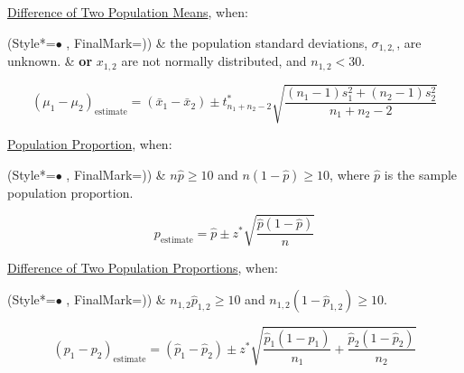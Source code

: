\underline{Difference of Two Population Means}, when:
\begin{easylist}[itemize]
\ListProperties(Style*=$\bullet$ , FinalMark={)})
\vspace{-2.0mm}
& the population standard deviations, $\sigma_{1,2,}$, are unknown.
\vspace{-3.5mm}
& \textbf{or} $x_{1,2}$ are not normally distributed, and $n_{1,2}<30$.
\end{easylist}
% 
\vspace{-5.0mm}
\begin{equation}
(\mu_1 - \mu_2)_{\textrm{estimate}} = (\bar{x}_1 - \bar{x}_2) \pm t_{n_1+n_2-2}^{*} \sqrt{\frac{(n_1-1)s_1^2 + (n_2-1)s_2^2}{n_1+n_2-2}}
\end{equation}

\underline{Population Proportion}, when:
\begin{easylist}[itemize]
\ListProperties(Style*=$\bullet$ , FinalMark={)})
\vspace{-2.0mm}
& $n\hat{p}\geq10$ and $n(1-\hat{p})\geq10$, where $\hat{p}$ is the sample population proportion.
\end{easylist}
% 
\vspace{-5.0mm}
\begin{equation}
p_{\textrm{estimate}} = \hat{p} \pm z^{*} \sqrt{\frac{\hat{p}(1-\hat{p})}{n}}
\end{equation}

\underline{Difference of Two Population Proportions}, when:
\begin{easylist}[itemize]
\ListProperties(Style*=$\bullet$ , FinalMark={)})
\vspace{-2.0mm}
& $n_{1,2}\hat{p}_{1,2}\geq10$ and $n_{1,2}(1-\hat{p}_{1,2})\geq10$.
\end{easylist}
% 
\vspace{-5.0mm}
\begin{equation}
(p_1 - p_2)_{\textrm{estimate}} = (\hat{p}_1 - \hat{p}_2) \pm z^{*} \sqrt{\frac{\hat{p}_1(1-\hat{p}_1)}{n_1}+ \frac{\hat{p}_2(1-\hat{p}_2)}{n_2}}
\end{equation}

